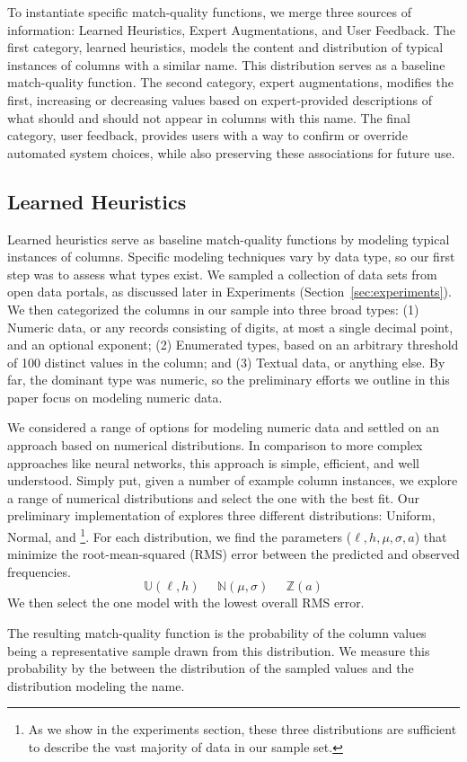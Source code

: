 
To instantiate specific match-quality functions, we merge three sources of information: Learned Heuristics, Expert Augmentations, and User Feedback. 
The first category, learned heuristics, models the content and distribution of typical instances of columns with a similar name.
This distribution serves as a baseline match-quality function.
The second category, expert augmentations, modifies the first, increasing or decreasing values based on expert-provided descriptions of what should and should not appear in columns with this name.
The final category, user feedback, provides users with a way to confirm or override automated system choices, while also preserving these associations for future use.

\subsection{Learned Heuristics}
Learned heuristics serve as baseline match-quality functions by modeling typical instances of columns.
Specific modeling techniques vary by data type, so our first step was to assess what types exist.
We sampled a collection of \placeholder{\#\#\#} data sets from open data portals, as discussed later in Experiments (Section~\ref{sec:experiments}).
We then categorized the \placeholder{\#\#\#} columns in our sample into three broad types: 
(1) Numeric data, or any records consisting of digits, at most a single decimal point, and an optional exponent; 
(2) Enumerated types, based on an arbitrary threshold of 100 distinct values in the column; and 
(3) Textual data, or anything else.  
By far, the dominant type was numeric, so the preliminary efforts we outline in this paper focus on modeling numeric data.

We considered a range of options for modeling numeric data and settled on an approach based on numerical distributions.
In comparison to more complex approaches like neural networks, this approach is simple, efficient, and well understood.
Simply put, given a number of example column instances, we explore a range of numerical distributions and select the one with the best fit.
Our preliminary implementation of \systemname explores three different distributions: Uniform, Normal, and \footnote{As we show in the experiments section, these three distributions are sufficient to describe the vast majority of data in our sample set.}.  
For each distribution, we find the parameters ($\ell,h,\mu,\sigma,a$) that minimize the root-mean-squared (RMS) error between the predicted and observed frequencies. 
$$\mathbb U(\ell, h)\;\;\;\;\;\mathbb N(\mu, \sigma)\;\;\;\;\;\mathbb Z(a)$$
We then select the one model with the lowest overall RMS error.

The resulting match-quality function is the probability of the column values being a representative sample drawn from this distribution.
We measure this probability by the  between the distribution of the sampled values and the distribution modeling the name.
